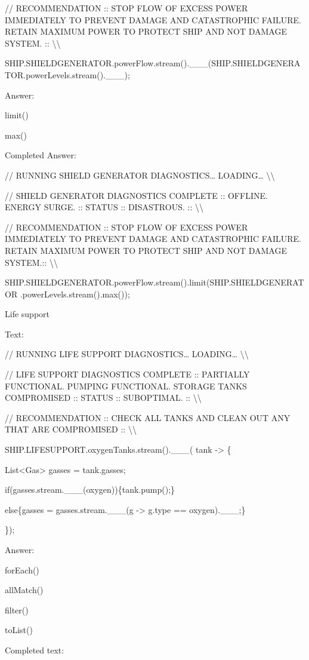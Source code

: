 \documentclass[
]{article}
\begin{document}
// RECOMMENDATION :: STOP FLOW OF EXCESS POWER IMMEDIATELY TO PREVENT
DAMAGE AND CATASTROPHIC FAILURE. RETAIN MAXIMUM POWER TO PROTECT SHIP
AND NOT DAMAGE SYSTEM. :: \textbackslash\textbackslash{}

SHIP.SHIELDGENERATOR.powerFlow.stream().\_\_\_(SHIP.SHIELDGENERATOR.powerLevels.stream().\_\_\_);

Answer:

limit()

max()

Completed Answer:

// RUNNING SHIELD GENERATOR DIAGNOSTICS\ldots{} LOADING\ldots{}
\textbackslash\textbackslash{}

// SHIELD GENERATOR DIAGNOSTICS COMPLETE :: OFFLINE. ENERGY SURGE. ::
STATUS :: DISASTROUS. :: \textbackslash\textbackslash{}

// RECOMMENDATION :: STOP FLOW OF EXCESS POWER IMMEDIATELY TO PREVENT
DAMAGE AND CATASTROPHIC FAILURE. RETAIN MAXIMUM POWER TO PROTECT SHIP
AND NOT DAMAGE SYSTEM.:: \textbackslash\textbackslash{}

SHIP.SHIELDGENERATOR.powerFlow.stream().limit(SHIP.SHIELDGENERATOR
.powerLevels.stream().max());

Life support

Text:

// RUNNING LIFE SUPPORT DIAGNOSTICS\ldots{} LOADING\ldots{}
\textbackslash\textbackslash{}

// LIFE SUPPORT DIAGNOSTICS COMPLETE :: PARTIALLY FUNCTIONAL. PUMPING
FUNCTIONAL. STORAGE TANKS COMPROMISED :: STATUS :: SUBOPTIMAL. ::
\textbackslash\textbackslash{}

// RECOMMENDATION :: CHECK ALL TANKS AND CLEAN OUT ANY THAT ARE
COMPROMISED :: \textbackslash\textbackslash{}

SHIP.LIFESUPPORT.oxygenTanks.stream().\_\_\_( tank -\textgreater{} \{

List\textless Gas\textgreater{} gasses = tank.gasses;

if(gasses.stream.\_\_\_(oxygen))\{tank.pump();\}

else\{gasses = gasses.stream.\_\_\_(g -\textgreater{} g.type ==
oxygen).\_\_\_;\}

\});

Answer:

forEach()

allMatch()

filter()

toList()

Completed text:
\end{document}
